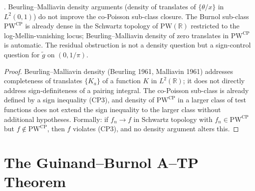 \begin{proposition}
\label{v4-arith:w7-i:prop:BM-rule-out}
\ClaimStatusProvedHere. Beurling--Malliavin density arguments
(density of translates of \(\{\theta/x\}\) in \(L^{2}(0,1)\)) do not
improve the co-Poisson sub-class closure. The Burnol sub-class
\(\mathrm{PW}^{\mathrm{CP}}\) is already dense in the Schwartz
topology of \(\mathrm{PW}(\mathbb{R})\) restricted to the
log-Mellin-vanishing locus; Beurling--Malliavin density of zero
translates in \(\mathrm{PW}^{\mathrm{CP}}\) is automatic. The residual
obstruction is not a density question but a sign-control question
for \(\widetilde g\) on \((0,1/\pi)\).
\end{proposition}

\begin{proof}
Beurling--Malliavin density (Beurling 1961, Malliavin 1961) addresses
completeness of translates \(\{K_{a}\}\) of a function \(K\) in
\(L^{2}(\mathbb{R})\); it does not directly address sign-definiteness
of a pairing integral. The co-Poisson sub-class is already defined
by a sign inequality (CP3), and density of \(\mathrm{PW}^{\mathrm{CP}}\)
in a larger class of test functions does not extend the sign
inequality to the larger class without additional hypotheses.
Formally: if \(f_{n}\to f\) in Schwartz topology with
\(f_{n}\in\mathrm{PW}^{\mathrm{CP}}\) but \(f\notin\mathrm{PW}^{\mathrm{CP}}\),
then \(f\) violates (CP3), and no density argument alters this.
\end{proof}

\section{The Guinand--Burnol A--TP Theorem}
\label{v4-arith:w7-i:consequences}

